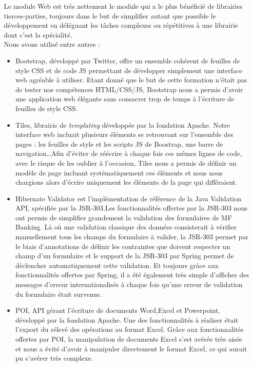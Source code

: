Le module Web est très nettement le module qui a le plus bénéficié de librairies tierces-parties, toujours dans le but de simplifier autant que possible le développement en déléguant les tâches complexes ou répétitives à une librairie dont c'est la spécialité.\\
Nous avons utilisé entre autres : 
\begin{itemize}
	\item Bootstrap, développé par Twitter, offre un ensemble cohérent de feuilles de style CSS et de code JS permettant de développer simplement une interface web agréable à utiliser. Etant donné que le but de cette formation n'était pas de tester nos compétences HTML/CSS/JS, Bootstrap nous a permis d'avoir une application web élégante sans consacrer trop de temps à l'écriture de feuilles de style CSS.
	\item Tiles, librairie de \textit{templating} développée par la fondation Apache. Notre interface web incluait plusieurs éléments se retrouvant sur l'ensemble des pages : les feuilles de style et les scripts JS de Boostrap, une barre de navigation\ldots Afin d'éviter de réécrire à chaque fois ces mêmes lignes de code, avec le risque de les oublier à l'occasion, Tiles nous a permis de définir un \og modèle \fg{} de page incluant systématiquement ces éléments et nous nous chargions alors d'écrire uniquement les éléments de la page qui différaient.
	\item Hibernate Validator est l'implémentation de référence de la Java Validation API, spécifiée par la JSR-303.Les fonctionnalités offertes par la JSR-303 nous ont permis de simplifier grandement la validation des formulaires de MF Banking. Là où une validation \og classique \fg{} des données consisterait à vérifier manuellement tous les champs du formulaire à valider, la JSR-303 permet par le biais d'annotations de définir les contraintes que doivent respecter un champ d'un formulaire et le support de la JSR-303 par Spring permet de déclencher automatiquement cette validation. Et toujours grâce aux fonctionnalités offertes par Spring, il a été également très simple d'afficher des messages d'erreur internationalisés à chaque fois qu'une erreur de validation du formulaire était survenue.
	\item POI, API gérant l'écriture de documents Word,Excel et Powerpoint, développé par la fondation Apache. Une des fonctionnalités à réaliser était l'export du rélevé des opérations au format Excel. Grâce aux fonctionnalités offertes par POI, la manipulation de documents Excel s'est avérée très aisée et nous a évité d'avoir à manipuler directement le format Excel, ce qui aurait pu s'avérer très complexe.\\
\end{itemize}

